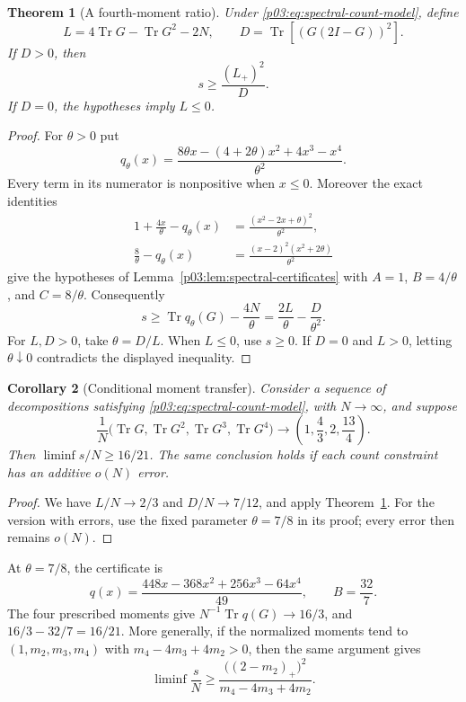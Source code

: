 \documentclass[11pt,letterpaper]{article}
\newtheorem{theorem}{Theorem}[section]
\newtheorem{corollary}[theorem]{Corollary}
\theoremstyle{definition}
\theoremstyle{remark}
\newcommand{\1}{\mathbf 1}
\begin{document}
\begin{theorem}[A fourth-moment ratio]\label{p03:thm:four-moment-ratio}
Under \eqref{p03:eq:spectral-count-model}, define
\[
 L=4\operatorname{Tr}G-\operatorname{Tr}G^2-2N,
 \qquad D=\operatorname{Tr}\!\left[(G(2I-G))^2\right].
\]
If $D>0$, then
\begin{equation}\label{p03:eq:four-moment-ratio}
 s\ge\frac{(L_+)^2}{D}.
\end{equation}
If $D=0$, the hypotheses imply $L\le0$.
\end{theorem}
\begin{proof}
For $\theta>0$ put
\[
 q_\theta(x)=\frac{8\theta x-(4+2\theta)x^2+4x^3-x^4}{\theta^2}.
\]
Every term in its numerator is nonpositive when $x\le0$. Moreover the exact identities
\begin{align*}
 1+\frac{4x}{\theta}-q_\theta(x)
 &=\frac{(x^2-2x+\theta)^2}{\theta^2},\\
 \frac8\theta-q_\theta(x)
 &=\frac{(x-2)^2(x^2+2\theta)}{\theta^2}
\end{align*}
give the hypotheses of Lemma~\ref{p03:lem:spectral-certificates} with $A=1$, $B=4/\theta$, and $C=8/\theta$. Consequently
\[
 s\ge\operatorname{Tr}q_\theta(G)-\frac{4N}{\theta}
 =\frac{2L}{\theta}-\frac{D}{\theta^2}.
\]
For $L,D>0$, take $\theta=D/L$. When $L\le0$, use $s\ge0$. If $D=0$ and $L>0$, letting $\theta\downarrow0$ contradicts the displayed inequality.
\end{proof}

\begin{corollary}[Conditional moment transfer]\label{p03:cor:conditional-four}
Consider a sequence of decompositions satisfying \eqref{p03:eq:spectral-count-model}, with $N\to\infty$, and suppose
\[
 \frac1N\bigl(\operatorname{Tr}G,\operatorname{Tr}G^2,
 \operatorname{Tr}G^3,\operatorname{Tr}G^4\bigr)
 \longrightarrow\left(1,\frac43,2,\frac{13}{4}\right).
\]
Then $\liminf s/N\ge16/21$. The same conclusion holds if each count constraint has an additive $o(N)$ error.
\end{corollary}
\begin{proof}
We have $L/N\to2/3$ and $D/N\to7/12$, and apply Theorem~\ref{p03:thm:four-moment-ratio}. For the version with errors, use the fixed parameter $\theta=7/8$ in its proof; every error then remains $o(N)$.
\end{proof}

At $\theta=7/8$, the certificate is
\[
 q(x)=\frac{448x-368x^2+256x^3-64x^4}{49},\qquad B=\frac{32}{7}.
\]
The four prescribed moments give $N^{-1}\operatorname{Tr}q(G)\to16/3$, and $16/3-32/7=16/21$. More generally, if the normalized moments tend to $(1,m_2,m_3,m_4)$ with $m_4-4m_3+4m_2>0$, then the same argument gives
\[
 \liminf\frac{s}{N}\ge
 \frac{\bigl((2-m_2)_+\bigr)^2}{m_4-4m_3+4m_2}.
\]
\end{document}

